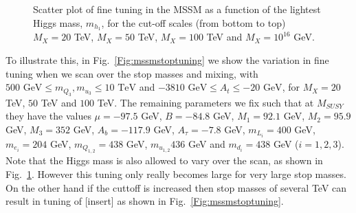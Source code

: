 \documentclass[preprint,amsmath,amssymb,aps,superscriptaddress,prd,showpacs,floatfix]{revtex4-1}
\begin{document}
\begin{figure}[h]
\begin{center}
\caption{Scatter plot of fine tuning in the MSSM as a function of
the lightest Higgs mass, $m_{h_1}$, for the cut-off scales (from 
bottom to top) $M_X=20$ TeV, $M_X=50$ TeV, $M_X=100$ TeV and $M_X=10^{16}$ GeV.}
\label{Fig:mssmhiggstuning}
\end{center}
\end{figure}
To illustrate this, in Fig.~\ref{Fig:mssmstoptuning} we show the variation in fine
tuning when we scan over the
stop masses and mixing, with $500 \textrm{ GeV} \leq
m_{Q_3},m_{u_3}\leq 10\textrm{ TeV}$ and $-3810\textrm{ GeV}\leq
A_t\leq -20\textrm{ GeV}$, for $M_X=20$ TeV, $50$ TeV and $100$ TeV.
The remaining parameters we fix such that at $M_{SUSY}$ they have the values $\mu=-97.5$ GeV, $B=-84.8$ GeV,
$M_1=92.1$ GeV, $M_2=95.9$ GeV, $M_3=352$ GeV, $A_b=-117.9$ GeV, $A_\tau=-7.8$ GeV, $m_{L_i}=400$ GeV, $m_{e_i}=204$ GeV,
$m_{Q_{1,2}}=438$ GeV, $m_{u_{1,2}}436$ GeV and $m_{d_i}=438$ GeV ($i=1,2,3$). 
Note that the Higgs mass is also allowed to vary over the scan, as shown in 
Fig.~\ref{Fig:mssmhiggstuning}.
However this tuning only really becomes large for very large stop
masses.  On the other hand if the cuttoff is increased then stop masses of
several TeV can result in tuning of [insert] as shown in
Fig.~\ref{Fig:mssmstoptuning}.\\ \\
\end{document}
